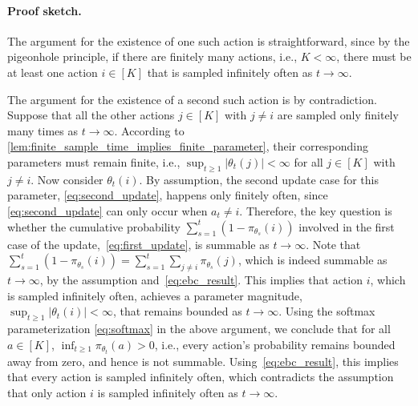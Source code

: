 \paragraph{Proof sketch.} 
The argument for the existence of one such action is straightforward, since by the pigeonhole principle, if there are finitely many actions, i.e., $K < \infty$, there must be at least one action $i \in [K]$ that is sampled infinitely often as $t \to \infty$.

The argument for the existence of a second such action is by contradiction. Suppose that all the other actions $j \in [K]$ with $j \ne i$ are sampled only finitely many times as $t \to \infty$. According to \cref{lem:finite_sample_time_implies_finite_parameter}, their corresponding parameters must remain finite, i.e., $\sup_{t \ge 1}{ |\theta_t(j)| } < \infty$ for all $j \in [K]$ with $j \ne i$. Now consider  $\theta_t(i)$. By assumption, the second update case for this parameter, \cref{eq:second_update}, happens only finitely often, since \cref{eq:second_update} can only occur when $a_t \ne i$. Therefore, the key question is whether the cumulative probability $\sum_{s=1}^{t} \left( 1 - \pi_{\theta_s}(i) \right)$ involved in the first case of the update,~\cref{eq:first_update}, is summable as $t \to \infty$. Note that $\sum_{s=1}^{t} \left( 1 - \pi_{\theta_s}(i) \right) = \sum_{s=1}^{t} \sum_{j \ne i}{ \pi_{\theta_s}(j) }$, which is indeed summable as $t \to \infty$, by the assumption and~\cref{eq:ebc_result}. This implies that   action $i$, which is sampled infinitely often, achieves a parameter magnitude, $\sup_{t \ge 1}{ |\theta_t(i)| } < \infty$, that remains bounded as $t\rightarrow\infty$. Using the softmax parameterization \cref{eq:softmax} in the above argument, we conclude that for all $a \in [K]$, $\inf_{t \ge 1}{ \pi_{\theta_t}(a)} > 0$, i.e., every action's probability remains bounded away from zero, and hence is not summable. Using~\cref{eq:ebc_result}, this implies that every action is sampled infinitely often, which contradicts the assumption that only action $i$ is sampled infinitely often as $t \to \infty$. 

